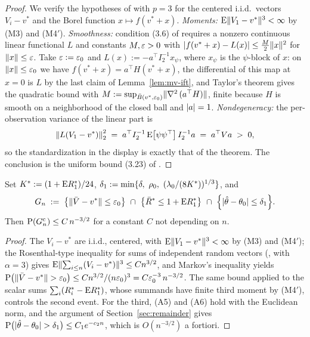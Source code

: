 \begin{proof}
We verify the hypotheses of \cite[Theorem~3.8]{Pinelis2016} with $p=3$ for the centered i.i.d.\ vectors $V_{i}-v^{*}$ and the Borel function $x\mapsto f(v^{*}+x)$. \emph{Moments:} $\E\norm{V_{1}-v^{*}}^{3}<\infty$ by (M3) and (M4$'$). \emph{Smoothness:} condition (3.6) of \cite{Pinelis2016} requires a nonzero continuous linear functional $L$ and constants $M,\eps>0$ with $\abs{f(v^{*}+x)-L(x)}\le\tfrac{M}{2}\norm{x}^{2}$ for $\norm{x}\le\eps$. Take $\eps:=\eps_{0}$ and $L(x):=-a^{\top}I_{2}^{-1}x_{\psi}$, where $x_{\psi}$ is the $\psi$-block of $x$: on $\norm{x}\le\eps_{0}$ we have $f(v^{*}+x)=a^{\top}H(v^{*}+x)$, the differential of this map at $x=0$ is $L$ by the last claim of Lemma~\ref{lem:mv-ift}, and Taylor's theorem gives the quadratic bound with $M:=\sup_{\bar B(v^{*},\eps_{0})}\norm{\nabla^{2}\,(a^{\top}H)}$, finite because $H$ is smooth on a neighborhood of the closed ball and $\abs{a}=1$. \emph{Nondegeneracy:} the per-observation variance of the linear part is
\[
\norm*{L(V_{1}-v^{*})}_{2}^{2}\;=\;a^{\top}I_{2}^{-1}\,\E\big[\psi\psi^{\top}\big]\,I_{2}^{-1}a\;=\;a^{\top}Va\;>\;0,
\]
so the standardization in the display is exactly that of the theorem. The conclusion is the uniform bound (3.23) of \cite{Pinelis2016}.
\end{proof}

\begin{lemma}\label{lem:mv-events}
Set $K^{*}:=(1+\E R^{*}_{1})/24$, $\delta_{1}:=\min\set{\delta,\ \rho_{0},\ (\lambda_{0}/(8K^{*}))^{1/3}}$, and
\[
G_{n}\;:=\;\set*{\norm{\bar V-v^{*}}\le\eps_{0}}\ \cap\ \set*{\bar R^{*}\le 1+\E R^{*}_{1}}\ \cap\ \set*{\abs{\hat\theta-\theta_{0}}\le\delta_{1}} .
\]
Then $\Prob(G_{n}^{\mathrm{c}})\le C\,n^{-3/2}$ for a constant $C$ not depending on $n$.
\end{lemma}

\begin{proof}
The $V_{i}-v^{*}$ are i.i.d., centered, with $\E\norm{V_{1}-v^{*}}^{3}<\infty$ by (M3) and (M4$'$); the Rosenthal-type inequality for sums of independent random vectors (\cite[(3.5)]{Pinelis2016}, with $\alpha=3$) gives $\E\norm{\sum_{i\le n}(V_{i}-v^{*})}^{3}\le Cn^{3/2}$, and Markov's inequality yields $\Prob\big(\norm{\bar V-v^{*}}>\eps_{0}\big)\le Cn^{3/2}/(n\eps_{0})^{3}=C\eps_{0}^{-3}\,n^{-3/2}$. The same bound applied to the scalar sums $\sum_{i}(R^{*}_{i}-\E R^{*}_{1})$, whose summands have finite third moment by (M4$'$), controls the second event. For the third, (A5) and (A6) hold with the Euclidean norm, and the argument of Section~\ref{sec:remainder} gives $\Prob\big(\abs{\hat\theta-\theta_{0}}>\delta_{1}\big)\le C_{1}e^{-c_{2}n}$, which is $O(n^{-3/2})$ a fortiori.
\end{proof}


